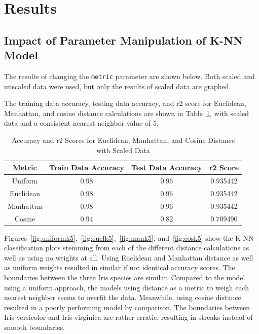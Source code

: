 \documentclass[journal]{IEEEtran}
\begin{document}
\section{Results}
\subsection{Impact of Parameter Manipulation of K-NN Model}

The results of changing the \lstinline{metric} parameter are shown below. Both scaled and unscaled data were used, but only the results of scaled data are graphed. 

The training data accuracy, testing data accuracy, and r2 score for Euclidean, Manhattan, and cosine distance calculations are shown in Table~\ref{table:accur5scaled}, with scaled data and a consistent nearest neighbor value of 5. 

\begin{table}[h!]
\centering
\begin{tabular}{ c | c c c }
Metric & Train Data Accuracy & Test Data Accuracy & r2 Score \\
\hline
Uniform & 0.98 & 0.96 & 0.935442 \\
Euclidean & 0.98 & 0.96 & 0.935442 \\
Manhattan & 0.98 & 0.96 & 0.935442 \\
Cosine & 0.94 & 0.82 & 0.709490 \\
\end{tabular}
\caption{Accuracy and r2 Scores for Euclidean, Manhattan, and Cosine Distance with Scaled Data}
\label{table:accur5scaled}
\end{table}

Figures~\ref{fig:uniformk5},~\ref{fig:euclk5},~\ref{fig:mank5}, and~\ref{fig:cosk5} show the K-NN classification plots stemming from each of the different distance calculations as well as using no weights at all. Using Euclidean and Manhattan distance as well as uniform weights resulted in similar if not identical accuracy scores. The boundaries between the three Iris species are similar. Compared to the model using a uniform approach, the models using distance as a metric to weigh each nearest neighbor seems to overfit the data. Meanwhile, using cosine distance resulted in a poorly performing model by comparison. The boundaries between Iris versicolor and Iris virginica are rather erratic, resulting in streaks instead of smooth boundaries.

\vspace{900px}
\end{document}
